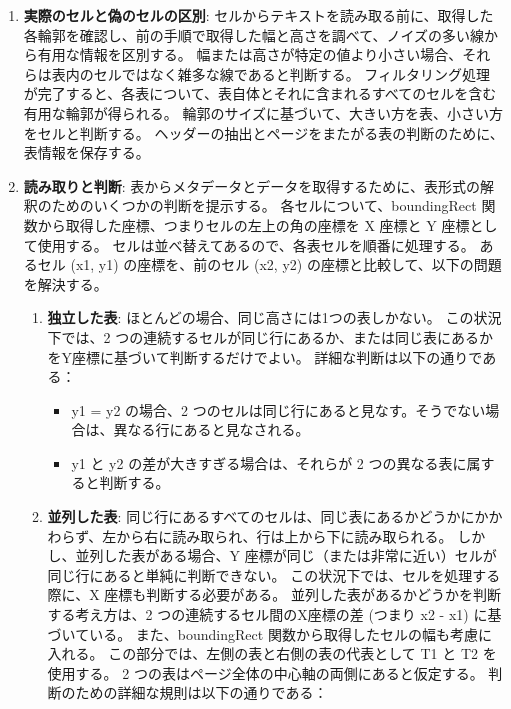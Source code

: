 \documentclass[uplatex, twocolumn,10pt]{jsarticle}
\begin{document}
\begin{enumerate}
    \item \textbf{実際のセルと偽のセルの区別}:
    セルからテキストを読み取る前に、取得した各輪郭を確認し、前の手順で取得した幅と高さを調べて、ノイズの多い線から有用な情報を区別する。
    幅または高さが特定の値より小さい場合、それらは表内のセルではなく雑多な線であると判断する。
    フィルタリング処理が完了すると、各表について、表自体とそれに含まれるすべてのセルを含む有用な輪郭が得られる。
    輪郭のサイズに基づいて、大きい方を表、小さい方をセルと判断する。
    ヘッダーの抽出とページをまたがる表の判断のために、表情報を保存する。
    \item \textbf{読み取りと判断}:
    表からメタデータとデータを取得するために、表形式の解釈のためのいくつかの判断を提示する。
    各セルについて、boundingRect 関数から取得した座標、つまりセルの左上の角の座標を X 座標と Y 座標として使用する。
    セルは並べ替えてあるので、各表セルを順番に処理する。
    あるセル (x1, y1) の座標を、前のセル (x2, y2) の座標と比較して、以下の問題を解決する。
    \begin{enumerate}
        \item \textbf{独立した表}:
        ほとんどの場合、同じ高さには1つの表しかない。
        この状況下では、2 つの連続するセルが同じ行にあるか、または同じ表にあるかをY座標に基づいて判断するだけでよい。
        詳細な判断は以下の通りである：
        \begin{itemize}
            \item y1 = y2 の場合、2 つのセルは同じ行にあると見なす。そうでない場合は、異なる行にあると見なされる。
            \item y1 と y2 の差が大きすぎる場合は、それらが 2 つの異なる表に属すると判断する。
        \end{itemize}
        \item \textbf{並列した表}:
        同じ行にあるすべてのセルは、同じ表にあるかどうかにかかわらず、左から右に読み取られ、行は上から下に読み取られる。
        しかし、並列した表がある場合、Y 座標が同じ（または非常に近い）セルが同じ行にあると単純に判断できない。
        この状況下では、セルを処理する際に、X 座標も判断する必要がある。
        並列した表があるかどうかを判断する考え方は、2 つの連続するセル間のX座標の差 (つまり x2 - x1) に基づいている。
        また、boundingRect 関数から取得したセルの幅も考慮に入れる。
        この部分では、左側の表と右側の表の代表として T1 と T2 を使用する。
        2 つの表はページ全体の中心軸の両側にあると仮定する。
        判断のための詳細な規則は以下の通りである：
        \begin{itemize}

\end{itemize}
\end{enumerate}
\end{enumerate}
\end{document}
